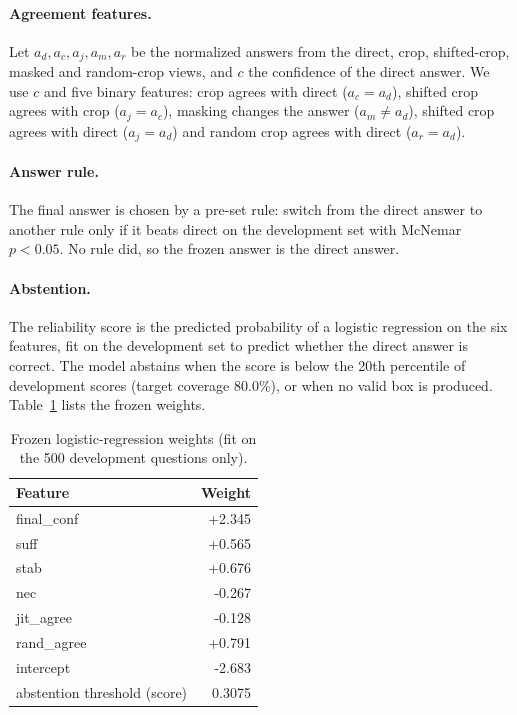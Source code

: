 \documentclass[11pt]{article}
\begin{document}
\paragraph{Agreement features.} Let $a_d, a_c, a_j, a_m, a_r$ be the normalized answers from the direct, crop, shifted-crop, masked and random-crop views, and $c$ the confidence of the direct answer. We use $c$ and five binary features: crop agrees with direct ($a_c=a_d$), shifted crop agrees with crop ($a_j=a_c$), masking changes the answer ($a_m\neq a_d$), shifted crop agrees with direct ($a_j=a_d$) and random crop agrees with direct ($a_r=a_d$).

\paragraph{Answer rule.} The final answer is chosen by a pre-set rule: switch from the direct answer to another rule only if it beats direct on the development set with McNemar $p<0.05$. No rule did, so the frozen answer is the direct answer.

\paragraph{Abstention.} The reliability score is the predicted probability of a logistic regression on the six features, fit on the development set to predict whether the direct answer is correct. The model abstains when the score is below the 20th percentile of development scores (target coverage 80.0\%), or when no valid box is produced. Table~\ref{tab:coef} lists the frozen weights.

\begin{table}[t]
\centering\small
\caption{Frozen logistic-regression weights (fit on the 500 development questions only).}\label{tab:coef}
\begin{tabular}{lr}
\toprule
Feature & Weight \\
\midrule
final\_conf & +2.345 \\
suff & +0.565 \\
stab & +0.676 \\
nec & -0.267 \\
jit\_agree & -0.128 \\
rand\_agree & +0.791 \\
intercept & -2.683 \\
abstention threshold (score) & 0.3075 \\
\bottomrule
\end{tabular}
\end{table}
\end{document}
